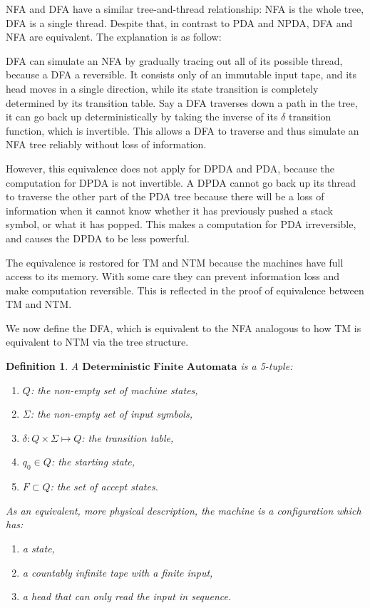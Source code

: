 \documentclass[12pt]{article}  %
\newtheorem{definition}{Definition}
\begin{document}
NFA and DFA have a similar tree-and-thread relationship: NFA is the whole tree, DFA is a single thread. Despite that, in contrast to PDA and NPDA, DFA and NFA are equivalent. The explanation is as follow:

DFA can simulate an NFA by gradually tracing out all of its possible thread, because a DFA a reversible. It consists only of an immutable input tape, and its head moves in a single direction, while its state transition is completely determined by its transition table. Say a DFA traverses down a path in the tree, it can go back up deterministically by taking the inverse of its $\delta$ transition function, which is invertible. This allows a DFA to traverse and thus simulate an NFA tree reliably without loss of information.

However, this equivalence does not apply for DPDA and PDA, because the computation for DPDA is not invertible. A DPDA cannot go back up its thread to traverse the other part of the PDA tree because there will be a loss of information when it cannot know whether it has previously pushed a stack symbol, or what it has popped. This makes a computation for PDA irreversible, and causes the DPDA to be less powerful.

The equivalence is restored for TM and NTM because the machines have full access to its memory. With some care they can prevent information loss and make computation reversible. This is reflected in the proof of equivalence between TM and NTM.

We now define the DFA, which is equivalent to the NFA analogous to how TM is equivalent to NTM via the tree structure.

\begin{definition}
A $\textbf{Deterministic Finite Automata}$ is a 5-tuple:
\begin{enumerate}
	\item $Q$: the non-empty set of machine states,
	\item $\Sigma$: the non-empty set of input symbols,
	\item $\delta: Q \times \Sigma \mapsto Q$: the transition table,
	\item $q_0 \in Q$: the starting state,
	\item $F \subset Q$: the set of accept states.
\end{enumerate}

As an equivalent, more physical description, the machine is a configuration which has:
\begin{enumerate}
	\item a state,
	\item a countably infinite tape with a finite input,
	\item a head that can only read the input in sequence.
\end{enumerate}
\end{definition}
\end{document}
